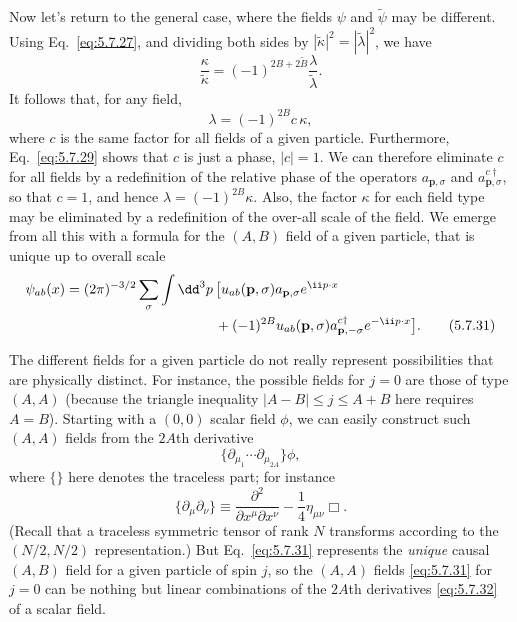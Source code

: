 Now let's return to the general case, where the fields $\psi$ and
$\widetilde\psi$ may be different. Using Eq.~\eqref{eq:5.7.27}, and dividing both sides
by $|\widetilde\kappa|^2=|\widetilde\lambda|^2$, we have
\[
\frac{\kappa}{\widetilde\kappa}=(-1)^{2B+2\widetilde B}
\frac{\lambda}{\widetilde\lambda}.
\]
It follows that, for any field,
\begin{equation}
\lambda=(-1)^{2B}c\,\kappa,
\tag{5.7.30}\label{eq:5.7.30}
\end{equation}
where $c$ is the same factor for all fields of a given particle. Furthermore,
Eq.~\eqref{eq:5.7.29} shows that $c$ is just a phase, $|c|=1$. We can therefore
eliminate $c$ for all fields by a redefinition of the relative phase of the
operators $a_{\mathbf p,\sigma}$ and $a^{c\dagger}_{\mathbf p,\sigma}$, so that
$c=1$, and hence $\lambda=(-1)^{2B}\kappa$. Also, the factor $\kappa$ for each
field type may be eliminated by a redefinition of the over-all scale of the
field. We emerge from all this with a formula for the $(A,B)$ field of a given
particle, that is unique up to overall scale
\begin{align}
\psi_{ab}(x)={}&(2\pi)^{-3/2}\sum_\sigma\int \dd^3p\,
\bigl[u_{ab}(\mathbf p,\sigma)a_{\mathbf p,\sigma}e^{\ii p\cdot x}
\notag\\
&\hspace{33mm}+(-1)^{2B}u_{ab}(\mathbf p,\sigma)
a^{c\dagger}_{\mathbf p,-\sigma}e^{-\ii p\cdot x}\bigr].
\tag{5.7.31}\label{eq:5.7.31}
\end{align}

The different fields for a given particle do not really represent
possibilities that are physically distinct. For instance, the possible fields
for $j=0$ are those of type $(A,A)$ (because the triangle inequality
$|A-B|\leq j\leq A+B$ here requires $A=B$). Starting with a $(0,0)$ scalar
field $\phi$, we can easily construct such $(A,A)$ fields from the $2A$th
derivative
\begin{equation}
\{\partial_{\mu_1}\cdots\partial_{\mu_{2A}}\}\phi,
\tag{5.7.32}\label{eq:5.7.32}
\end{equation}
where $\{\}$ here denotes the traceless part; for instance
\[
\{\partial_\mu\partial_\nu\}\equiv
\frac{\partial^2}{\partial x^\mu\partial x^\nu}
-\frac14\eta_{\mu\nu}\Box.
\]
(Recall that a traceless symmetric tensor of rank $N$ transforms according to
the $(N/2,N/2)$ representation.) But Eq.~\eqref{eq:5.7.31} represents the \emph{unique}
causal $(A,B)$ field for a given particle of spin $j$, so the $(A,A)$ fields
\eqref{eq:5.7.31} for $j=0$ can be nothing but linear combinations of the $2A$th
derivatives \eqref{eq:5.7.32} of a scalar field.

